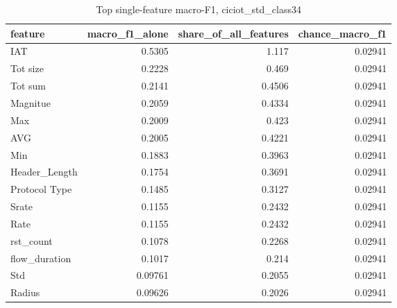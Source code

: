 \begin{table}
\caption{Top single-feature macro-F1, ciciot_std_class34}
\begin{tabular}{lrrr}
\toprule
feature & macro_f1_alone & share_of_all_features & chance_macro_f1 \\
\midrule
IAT & 0.5305 & 1.117 & 0.02941 \\
Tot size & 0.2228 & 0.469 & 0.02941 \\
Tot sum & 0.2141 & 0.4506 & 0.02941 \\
Magnitue & 0.2059 & 0.4334 & 0.02941 \\
Max & 0.2009 & 0.423 & 0.02941 \\
AVG & 0.2005 & 0.4221 & 0.02941 \\
Min & 0.1883 & 0.3963 & 0.02941 \\
Header_Length & 0.1754 & 0.3691 & 0.02941 \\
Protocol Type & 0.1485 & 0.3127 & 0.02941 \\
Srate & 0.1155 & 0.2432 & 0.02941 \\
Rate & 0.1155 & 0.2432 & 0.02941 \\
rst_count & 0.1078 & 0.2268 & 0.02941 \\
flow_duration & 0.1017 & 0.214 & 0.02941 \\
Std & 0.09761 & 0.2055 & 0.02941 \\
Radius & 0.09626 & 0.2026 & 0.02941 \\
\bottomrule
\end{tabular}
\end{table}
